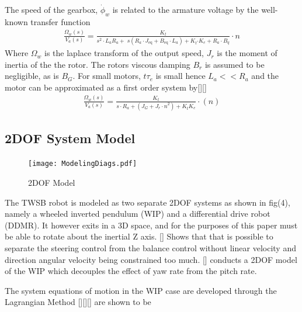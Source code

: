     The speed of the gearbox, $\dot\phi_w$ is related to the armature voltage by the well-known transfer function
    \begin{equation}
        \begin{aligned}
            \frac{\Omega_w \left(s\right)}{V_a \left(s\right)}=\frac{K_t }{s^2 \cdot L_a R_a +\;s\left(R_a \cdot J_{\mathrm{eq}} +B_{\mathrm{eq}} \cdot L_a \right)+K_t {\cdot K}_e +R_a \cdot B_q }\cdot n
        \end{aligned}
    \end{equation}
    Where $\Omega_w$ is the laplace transform of the output speed, $J_r$ is the moment of inertia of the the rotor.
    The rotors viscous damping $B_r$ is assumed to be negligible, as is $B_G$. 
    For small motors, $t\tau_e$ is small hence $L_a << R_a$ and the motor can be approximated as a first order system by[][]
    \begin{equation}
        \begin{aligned}
            \frac{\Omega_w \left(s\right)}{V_a \left(s\right)}=\frac{K_t }{s\cdot R_a + \left(J_G +{J_r \cdot n}^2 \right)+K_t K_e }\cdot\left(n\right)
        \end{aligned}
    \end{equation}

    \pagebreak{}


    \subsection{2DOF System Model}

    \begin{figure}[H]
        \texttt{[image: ModelingDiags.pdf]}
        \caption{2DOF Model}
    \end{figure}

    The TWSB robot is modeled as two separate 2DOF systems as shown in fig(4), 
    namely a wheeled inverted pendulum (WIP) and a differential drive robot (DDMR).
    It however exits in a 3D space, and for the purposes of this paper must be able to rotate about the inertial Z axis. 
    [] Shows that that is possible to separate the steering control from the balance control 
    without linear velocity and direction angular velocity being constrained too much. 
    [] conducts a 2DOF model of the WIP which  decouples the effect of yaw rate from the pitch rate. 

    The system equations of motion in the WIP case are developed through the Lagrangian Method [][][] are shown to be 
    
